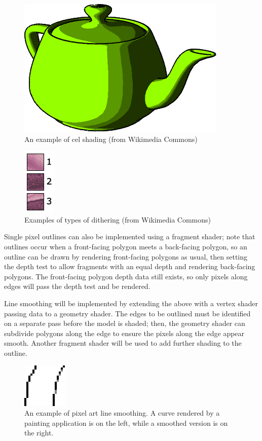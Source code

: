 \documentclass[12pt,twoside,notitlepage]{report}
\begin{document}
\begin{figure}[h!]
\centering
\includegraphics{celshading}
\caption{An example of cel shading (from Wikimedia Commons)}
\end{figure}

\begin{figure}[h!]
\centering
\includegraphics{dithering}
\caption{Examples of types of dithering (from Wikimedia Commons)}
\end{figure}

Single pixel outlines can also be implemented using a fragment shader; note that outlines occur when a front-facing polygon meets a back-facing polygon, so an outline can be drawn by rendering front-facing polygons as usual, then setting the depth test to allow fragments with an equal depth and rendering back-facing polygons. The front-facing polygon depth data still exists, so only pixels along edges will pass the depth test and be rendered.

Line smoothing will be implemented by extending the above with a vertex shader passing data to a geometry shader. The edges to be outlined must be identified on a separate pass before the model is shaded; then, the geometry shader can subdivide polygons along the edge to ensure the pixels along the edge appear smooth. Another fragment shader will be used to add further shading to the outline.

\begin{figure}[h!]
\centering
\includegraphics{linesmoothing}
\caption{An example of pixel art line smoothing. A curve rendered by a painting application is on the left, while a smoothed version is on the right.}
\label{fig:linesmoothing}
\end{figure}
\end{document}
